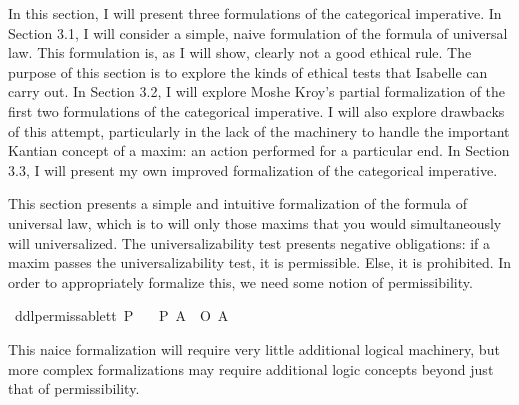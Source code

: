%
\begin{isabellebody}%
%
%
\isadelimtheory
%
\endisadelimtheory
%
\isatagtheory
%
\endisatagtheory
{\isafoldtheory}%
%
\isadelimtheory
%
\endisadelimtheory
%
\isadelimdocument
%
\endisadelimdocument
%
\isatagdocument
%
\isamarkuptrue%
%
\endisatagdocument
{\isafolddocument}%
%
\isadelimdocument
%
\endisadelimdocument
%
\begin{isamarkuptext}%
In this section, I will present three formulations of the categorical imperative. In Section 3.1, I will 
consider a simple, naive formulation of the formula of universal law. This formulation is, as I will 
show, clearly not a good ethical rule. The purpose of this section is to explore the kinds of ethical
tests that Isabelle can carry out. In Section 3.2, I will explore Moshe Kroy's \cite{kroy} partial formalization of 
the first two formulations of the categorical imperative. I will also explore drawbacks of this attempt, 
particularly in the lack of the machinery to handle the important Kantian concept of a maxim: an action 
performed for a particular end. In Section 3.3, I will present my own improved
formalization of the categorical imperative.%
\end{isamarkuptext}\isamarkuptrue%
%
\isadelimdocument
%
\endisadelimdocument
%
\isatagdocument
%
\isamarkuptrue%
%
\endisatagdocument
{\isafolddocument}%
%
\isadelimdocument
%
\endisadelimdocument
%
\begin{isamarkuptext}%
This section presents a simple and intuitive formalization of the formula of universal law, which 
is to will only those maxims that you would simultaneously will universalized. The universalizability 
test presents negative obligations: if a maxim passes the universalizability test, it is permissible. Else,
it is prohibited. In order to appropriately formalize this, we need some notion of permissibility.%
\end{isamarkuptext}\isamarkuptrue%
\isamarkupfalse%
\ ddlpermissable{\isacharcolon}{\isacharcolon}{\isachardoublequoteopen}t{\isasymRightarrow}t{\isachardoublequoteclose}\ {\isacharparenleft}{\isachardoublequoteopen}P{\isacharunderscore}{\isachardoublequoteclose}{\isacharparenright}\isanewline
\ \ \ {\isachardoublequoteopen}{\isacharparenleft}P\ A{\isacharparenright}\ {\isasymequiv}\ {\isacharparenleft}\isactrlbold {\isasymnot}{\isacharparenleft}O\ {\isacharbraceleft}\isactrlbold {\isasymnot}A{\isacharbraceright}{\isacharparenright}{\isacharparenright}{\isachardoublequoteclose}\isanewline
%
%
\begin{isamarkuptext}%
This naice formalization will require very little additional logical machinery, but more complex
formalizations may require additional logic concepts beyond just that of permissibility. 


\end{isamarkuptext}
\end{isabellebody}
